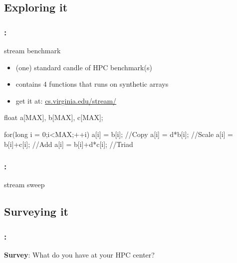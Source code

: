 \documentclass[9pt,xcolor=table]{beamer}
\begin{document}
\subsection{Exploring it}
\begin{frame}[fragile]
\frametitle{\insertsectionhead{}: \insertsubsection{}}
\begin{block}{stream benchmark \cite{McCalpin1995,McCalpin2007}}
  \begin{itemize}
  \item (one) standard candle of HPC benchmark(s)
  \item contains 4 functions that runs on synthetic arrays 
  \item get it at: \href{http://www.cs.virginia.edu/stream/}{cs.virginia.edu/stream/}
  \end{itemize}
\end{block}

\begin{pyglist}[language=c++,numbers=left,style=emacs]
  float a[MAX], b[MAX], c[MAX];
  
  for(long i = 0;i<MAX;++i)
  {
    a[i] = b[i];        //Copy
    a[i] = d*b[i];      //Scale
    a[i] = b[i]+c[i];   //Add
    a[i] = b[i]+d*c[i]; //Triad
  }
  \end{pyglist}
\end{frame}

\begin{frame}
\frametitle{\insertsectionhead{}: \insertsubsection{}}
\huge
\begin{center}
  stream sweep
\end{center}
\end{frame}

\subsection{Surveying it}
\begin{frame}
\frametitle{\insertsectionhead{}: \insertsubsection{}}
\huge
\begin{center}
  \textbf{Survey}: What do you have at your HPC center?
\end{center}
\end{frame}
\end{document}
